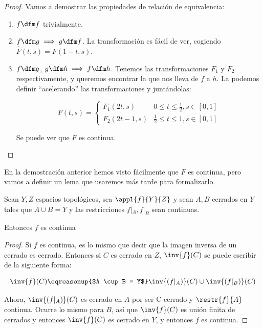 \documentclass{apuntes}
\begin{document}
\begin{proof}
Vamos a demostrar las propiedades de relación de equivalencia:

\begin{enumerate}
	\item $f \dfm f$ trivialmente.
	\item ${{f \dfm g} \implies {g \dfm f}}$. La transformación es fácil de ver, cogiendo \\
	${\hat{F}(t, s) = F(1-t, s)}$.
	\item $f \dfm g$, $g \dfm h \implies f \dfm h$. Tenemos las transformaciones $F_1$ y $F_2$ respectivamente, y queremos encontrar la que nos lleva de $f$ a $h$. La podemos definir ``acelerando'' las transformaciones y juntándolas:

	\[F(t,s) =
	\begin{cases}
		F_1(2t, s) & 0 ≤ t ≤ \frac{1}{2}, s∈[0,1] \\
		F_2(2t-1, s) & \frac{1}{2} ≤ t ≤ 1, s∈[0,1]
	\end{cases} \]

	Se puede ver que $F$ es continua.
\end{enumerate}
\end{proof}

En la demostración anterior hemos visto fácilmente que $F$ es continua, pero vamos a definir un lema que usaremos más tarde para formalizarlo.

\begin{lemma} \label{lemContRestr} Sean $Y,Z$ espacios topológicos, sea $\appl{f}{Y}{Z}$ y sean $A,B$ cerrados en $Y$ tales que $A ∪ B = Y$ y las restricciones $f|_A, f|_B$ sean continuas.

Entonces $f$ es continua
\end{lemma}

\begin{proof} Si $f$ es continua, es lo mismo que decir que la imagen inversa de un cerrado es cerrado. Entonces si $C$ es cerrado en $Z$, $\inv{f}(C)$ se puede escribir de la siguiente forma:

\[ \inv{f}(C) \eqreasonup{$A \cup B = Y$} \inv{\left(f|_A\right)} ( C) \cup \inv{\left(f|_B\right)} (C) \]

Ahora, $\inv{\left(f|_A\right)} (C)$ es cerrado en $A$ por ser C cerrado y $\restr{f}{A}$ continua. Ocurre lo mismo para $B$, así que $\inv{f}(C)$ es unión finita de cerrados y entonces $\inv{f}(C)$ es cerrado en $Y$, y entonces $f$ es continua.
\end{proof}
\end{document}
